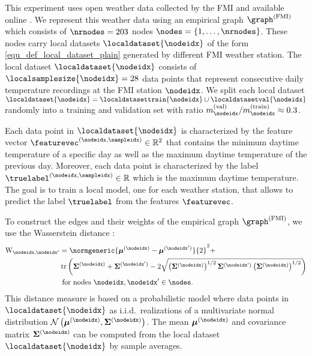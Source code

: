 \documentclass[lettersize,journal]{IEEEtran}
\newcommand{\localvalsetsize}[1]{m^{(\rm val)}_{#1}}
\newcommand{\localtrainsetsize}[1]{m^{(\rm train)}_{#1}}
\begin{document}

This experiment uses open weather data collected by the FMI and available online \cite{FMIurl}. 
We represent this weather data using an empirical graph $\graph^{(\rm FMI)}$ which consists of $\nrnodes=203$ 
nodes $\nodes = \{1,\ldots,\nrnodes\}$. These nodes carry local datasets $\localdataset{\nodeidx}$ 
of the form \eqref{equ_def_local_dataset_plain} generated by different FMI weather station. 
The local dataset $\localdataset{\nodeidx}$ consists of $\localsamplesize{\nodeidx}=28$ 
data points that represent consecutive daily temperature recordings at the FMI station $\nodeidx$. 
We split each local dataset $\localdataset{\nodeidx} = \localdatasettrain{\nodeidx} \cup  \localdatasetval{\nodeidx}$ 
randomly into a training and validation set with ratio $\localvalsetsize{\nodeidx}/\localtrainsetsize{\nodeidx}\approx 0.3$. 

Each data point in $\localdataset{\nodeidx}$ is characterized by the feature vector 
$\featurevec^{(\nodeidx,\sampleidx)} \in \mathbb{R}^{2}$ that contains the minimum daytime 
temperature of a specific day as well as the maximum daytime temperature of the previous day. 
Moreover, each data point is characterized by the label $\truelabel^{(\nodeidx,\sampleidx)} \in \mathbb{R}$ 
which is the maximum daytime temperature. The goal is to train a local model, one for each weather 
station, that allows to predict the label $\truelabel$ from the features $\featurevec$. 

To construct the edges and their weights of the empirical graph $\graph^{(\rm FMI)}$, we use  
the Wasserstein distance \cite[Prop.\ 7]{Clark1984Wasserstein}:
\begin{equation} 
\begin{aligned}
    \mathrm{W}_{\nodeidx,\nodeidx'} & = \normgeneric{{\bm \mu}^{(\nodeidx)}-{\bm \mu}^{(\nodeidx')}}{2}^{2}+ \\ 
    & \operatorname{tr}\left({\bf \Sigma}^{(\nodeidx)}+{\bf \Sigma}^{(\nodeidx')}-2\sqrt{\left({\bf \Sigma}^{(\nodeidx)}\right)^{1/2} {\bf \Sigma}^{(\nodeidx')} \left({\bf \Sigma}^{(\nodeidx)}\right)^{1/2}}\right) \\
    & \mbox{ for nodes } \nodeidx, \nodeidx' \in \nodes. 
\end{aligned}	
\end{equation} 
This distance measure is based on a probabilistic model where data points in $\localdataset{\nodeidx}$ as i.i.d.\ 
realizations of a multivariate normal distribution $\mathcal{N}\left({\bm \mu}^{(\nodeidx)}, {\bf \Sigma}^{(\nodeidx)}\right)$.  
The mean ${\bm \mu}^{(\nodeidx)}$ and covariance matrix ${\bf \Sigma}^{(\nodeidx)}$ can be computed from 
the local dataset $\localdataset{\nodeidx}$ by sample averages. 
\end{document}
